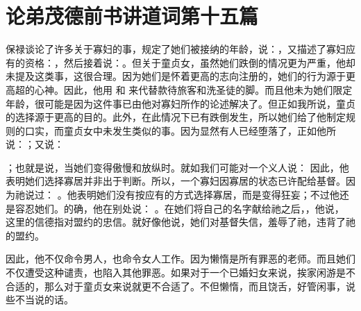 
\section{论弟茂德前书讲道词第十五篇}

\par

\par

保禄谈论了许多关于寡妇的事，规定了她们被接纳的年龄，说：，又描述了寡妇应有的资格：，然后接着说：。但关于童贞女，虽然她们跌倒的情况更为严重，他却未提及这类事，这很合理。因为她们是怀着更高的志向注册的，她们的行为源于更高超的心神。因此，他用  和  来代替款待旅客和洗圣徒的脚。而且他未为她们限定年龄，很可能是因为这件事已由他对寡妇所作的论述解决了。但正如我所说，童贞的选择源于更高的目的。此外，在此情况下已有跌倒发生，所以她们给了他制定规则的口实，而童贞女中未发生类似的事。因为显然有人已经堕落了，正如他所说：；又说：\par

；也就是说，当她们变得傲慢和放纵时。就如我们可能对一个义人说： 因此，他表明她们选择寡居并非出于判断。所以，一个寡妇因寡居的状态已许配给基督。因为祂说过： 。他表明她们没有按应有的方式选择寡居，而是变得狂妄；不过他还是容忍她们。的确，他在别处说： 。在她们将自己的名字献给祂之后，，他说， 这里的信德指对盟约的忠信。就好像他说，她们对基督失信，羞辱了祂，违背了祂的盟约。\par

因此，他不仅命令男人，也命令女人工作。因为懒惰是所有罪恶的老师。而且她们不仅遭受这种谴责，也陷入其他罪恶。如果对于一个已婚妇女来说，挨家闲游是不合适的，那么对于童贞女来说就更不合适了。不但懒惰，而且饶舌，好管闲事，说些不当说的话。\par

